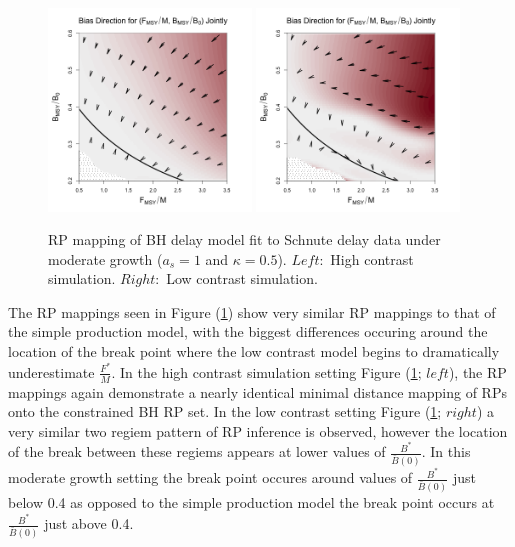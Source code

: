 %
\begin{figure}[h!]
\includegraphics[width=0.48\textwidth]{../ddBias/directionalBiasDDSubExpT45N150A0-1AS4K0.2N38.png} %
\includegraphics[width=0.48\textwidth]{../ddBias/directionalBiasDDSubFlatT45N150A0-1AS1K0.5N56.png} %
\caption{
RP mapping of BH delay model fit to Schnute delay data under moderate growth ($a_s=1$ and $\kappa=0.5$).
$Left:$ High contrast simulation.
$Right:$ Low contrast simulation.
}\label{moderateGrowth}
\end{figure}

%
The RP mappings seen in Figure (\ref{moderateGrowth}) show very similar RP mappings
to that of the simple production model, with the biggest differences occuring
around the location of the break point where the low contrast model begins to
dramatically underestimate $\frac{F^*}{M}$.
%
In the high contrast simulation setting Figure (\ref{moderateGrowth}; $left$),
the RP mappings again demonstrate a nearly identical minimal distance mapping of
RPs onto the constrained BH RP set. In the low contrast setting Figure (\ref{moderateGrowth}; $right$)
a very similar two regiem pattern of RP inference is observed, however the
location of the break between these regiems appears at lower values of
$\frac{B^*}{\bar B(0)}$. In this moderate growth setting the break point
occures around values of $\frac{B^*}{\bar B(0)}$ just below 0.4 as opposed to 
the simple production model the break point occurs at $\frac{B^*}{\bar B(0)}$
just above 0.4.

